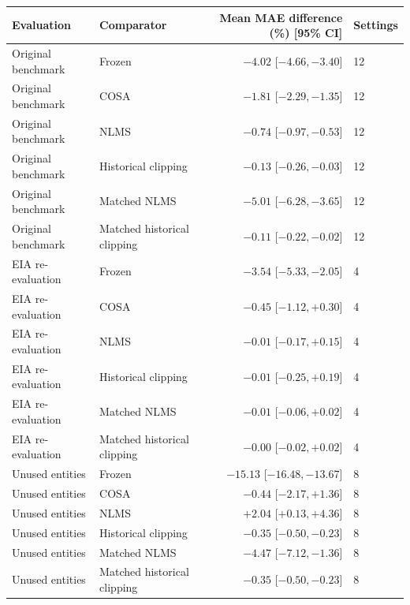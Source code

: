 \begin{tabular}{llrl}
\toprule
Evaluation & Comparator & Mean MAE difference (\%) [95\% CI] & Settings\\
\midrule
Original benchmark & Frozen & $-4.02$ [$ -4.66, -3.40 $] & 12\\
Original benchmark & COSA & $-1.81$ [$ -2.29, -1.35 $] & 12\\
Original benchmark & NLMS & $-0.74$ [$ -0.97, -0.53 $] & 12\\
Original benchmark & Historical clipping & $-0.13$ [$ -0.26, -0.03 $] & 12\\
Original benchmark & Matched NLMS & $-5.01$ [$ -6.28, -3.65 $] & 12\\
Original benchmark & Matched historical clipping & $-0.11$ [$ -0.22, -0.02 $] & 12\\
EIA re-evaluation & Frozen & $-3.54$ [$ -5.33, -2.05 $] & 4\\
EIA re-evaluation & COSA & $-0.45$ [$ -1.12, +0.30 $] & 4\\
EIA re-evaluation & NLMS & $-0.01$ [$ -0.17, +0.15 $] & 4\\
EIA re-evaluation & Historical clipping & $-0.01$ [$ -0.25, +0.19 $] & 4\\
EIA re-evaluation & Matched NLMS & $-0.01$ [$ -0.06, +0.02 $] & 4\\
EIA re-evaluation & Matched historical clipping & $-0.00$ [$ -0.02, +0.02 $] & 4\\
Unused entities & Frozen & $-15.13$ [$ -16.48, -13.67 $] & 8\\
Unused entities & COSA & $-0.44$ [$ -2.17, +1.36 $] & 8\\
Unused entities & NLMS & $+2.04$ [$ +0.13, +4.36 $] & 8\\
Unused entities & Historical clipping & $-0.35$ [$ -0.50, -0.23 $] & 8\\
Unused entities & Matched NLMS & $-4.47$ [$ -7.12, -1.36 $] & 8\\
Unused entities & Matched historical clipping & $-0.35$ [$ -0.50, -0.23 $] & 8\\
\bottomrule
\end{tabular}

